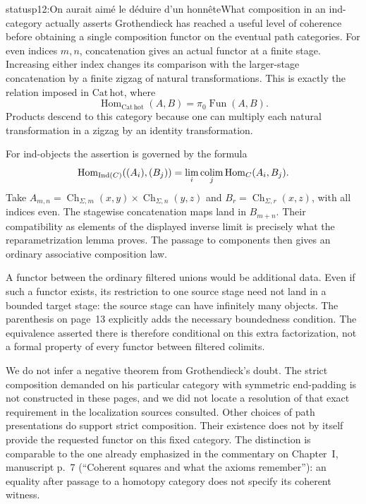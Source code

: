 \begin{dcomment}{status}{p12:On aurait aimé le déduire d'un honnête}{What composition in an ind-category actually asserts}
Grothendieck has reached a useful level of coherence before obtaining a single composition functor on the eventual path categories. For even indices $m,n$, concatenation gives an actual functor at a finite stage. Increasing either index changes its comparison with the larger-stage concatenation by a finite zigzag of natural transformations. This is exactly the relation imposed in $\mathrm{Cat\,hot}$, where
\[
 \operatorname{Hom}_{\mathrm{Cat\,hot}}(A,B)
   =\pi_0\operatorname{Fun}(A,B).
\]
Products descend to this category because one can multiply each natural transformation in a zigzag by an identity transformation.

For ind-objects the assertion is governed by the formula
\[
 \operatorname{Hom}_{\operatorname{Ind}(C)}
       ((A_i),(B_j))
   =\lim_i\mathop{\rm colim}_j\operatorname{Hom}_C(A_i,B_j).
\]
Take $A_{m,n}=\operatorname{Ch}_{\Sigma,m}(x,y)\times
\operatorname{Ch}_{\Sigma,n}(y,z)$ and $B_r=\operatorname{Ch}_{\Sigma,r}(x,z)$, with all indices even. The stagewise concatenation maps land in $B_{m+n}$. Their compatibility as elements of the displayed inverse limit is precisely what the reparametrization lemma proves. The passage to components then gives an ordinary associative composition law.

A functor between the ordinary filtered unions would be additional data. Even if such a functor exists, its restriction to one source stage need not land in a bounded target stage: the source stage can have infinitely many objects. The parenthesis on page~13 explicitly adds the necessary boundedness condition. The equivalence asserted there is therefore conditional on this extra factorization, not a formal property of every functor between filtered colimits.

We do not infer a negative theorem from Grothendieck's doubt. The strict composition demanded on his particular category with symmetric end-padding is not constructed in these pages, and we did not locate a resolution of that exact requirement in the localization sources consulted. Other choices of path presentations do support strict composition. Their existence does not by itself provide the requested functor on this fixed category. The distinction is comparable to the one already emphasized in the commentary on Chapter~I, manuscript p.~7 (``Coherent squares and what the axioms remember''): an equality after passage to a homotopy category does not specify its coherent witness.
\end{dcomment}

